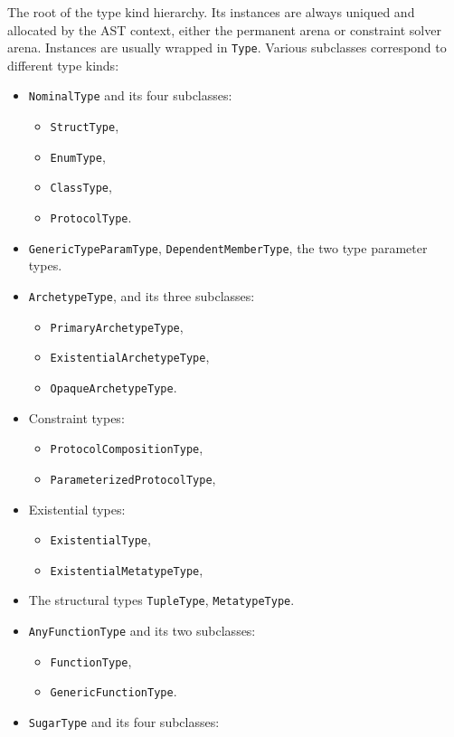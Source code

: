 \documentclass[../generics]{subfiles}
\begin{document}
The root of the type kind hierarchy. Its instances are always uniqued and allocated by the AST context, either the permanent arena or constraint solver arena. Instances are usually wrapped in \texttt{Type}. Various subclasses correspond to different type kinds:
\begin{itemize}
\item \texttt{NominalType} and its four subclasses:
\begin{itemize}
\item \texttt{StructType},
\item \texttt{EnumType},
\item \texttt{ClassType},
\item \texttt{ProtocolType}.
\end{itemize}
\item \texttt{GenericTypeParamType}, \texttt{DependentMemberType}, the two type parameter types.
\item \texttt{ArchetypeType}, and its three subclasses:
\begin{itemize}
\item \texttt{PrimaryArchetypeType},
\item \texttt{ExistentialArchetypeType},
\item \texttt{OpaqueArchetypeType}.
\end{itemize}
\item Constraint types:
\begin{itemize}
\item \texttt{ProtocolCompositionType},
\item \texttt{ParameterizedProtocolType},
\end{itemize}
\item Existential types:
\begin{itemize}
\item \texttt{ExistentialType},
\item \texttt{ExistentialMetatypeType},
\end{itemize}
\item The structural types \texttt{TupleType}, \texttt{MetatypeType}.
\item \texttt{AnyFunctionType} and its two subclasses:
\begin{itemize}
\item \texttt{FunctionType},
\item \texttt{GenericFunctionType}.
\end{itemize}
\item \texttt{SugarType} and its four subclasses:

\end{itemize}
\end{document}
